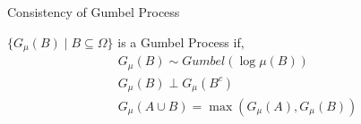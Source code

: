 \begin{frame}{Consistency of Gumbel Process}
  \begin{definition}
    $\{G_\mu(B) \mid B \subseteq \Omega\}$ is a Gumbel Process if,
    \begin{align*} 
      & G_\mu(B) \sim Gumbel(\log \mu(B)) \tag{samples are regional maxes}\\
      & G_\mu(B) \perp G_\mu(B^c) \tag{regional maxes are independent}\\
      & G_\mu(A \cup B) = \max(G_\mu(A),G_\mu(B)) \tag{maxes are consistent}
    \end{align*}
  \end{definition}

\end{frame}
